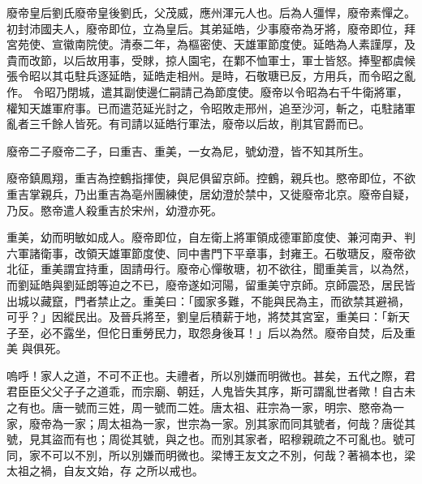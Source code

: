 
\begin{pinyinscope}

 廢帝皇后劉氏廢帝皇後劉氏，父茂威，應州渾元人也。后為人彊悍，廢帝素憚之。初封沛國夫人，廢帝即位，立為皇后。其弟延皓，少事廢帝為牙將，廢帝即位，拜宮苑使、宣徽南院使。清泰二年，為樞密使、天雄軍節度使。延皓為人素謹厚，及貴而改節，以后故用事，受賕，掠人園宅，在鄴不恤軍士，軍士皆怒。捧聖都虞候張令昭以其屯駐兵逐延皓，延皓走相州。是時，石敬瑭已反，方用兵，而令昭之亂作。
 令昭乃閉城，遣其副使邊仁嗣請己為節度使。廢帝以令昭為右千牛衛將軍，權知天雄軍府事。已而遣范延光討之，令昭敗走邢州，追至沙河，斬之，屯駐諸軍亂者三千餘人皆死。有司請以延皓行軍法，廢帝以后故，削其官爵而已。



 廢帝二子廢帝二子，曰重吉、重美，一女為尼，號幼澄，皆不知其所生。



 廢帝鎮鳳翔，重吉為控鶴指揮使，與尼俱留京師。控鶴，親兵也。愍帝即位，不欲重吉掌親兵，乃出重吉為亳州團練使，居幼澄於禁中，又徙廢帝北京。廢帝自疑，乃反。愍帝遣人殺重吉於宋州，幼澄亦死。



 重美，幼而明敏如成人。廢帝即位，自左衛上將軍領成德軍節度使、兼河南尹、判六軍諸衛事，改領天雄軍節度使、同中書門下平章事，封雍王。石敬瑭反，廢帝欲北征，重美謂宜持重，固請毋行。廢帝心憚敬瑭，初不欲往，聞重美言，以為然，而劉延皓與劉延朗等迫之不已，廢帝遂如河陽，留重美守京師。京師震恐，居民皆出城以藏竄，門者禁止之。重美曰：「國家多難，不能與民為主，而欲禁其避禍，可乎？」因縱民出。及晉兵將至，劉皇后積薪于地，將焚其宮室，重美曰：「新天子至，必不露坐，但佗日重勞民力，取怨身後耳！」后以為然。廢帝自焚，后及重美
 與俱死。



 嗚呼！家人之道，不可不正也。夫禮者，所以別嫌而明微也。甚矣，五代之際，君君臣臣父父子子之道乖，而宗廟、朝廷，人鬼皆失其序，斯可謂亂世者歟！自古未之有也。唐一號而三姓，周一號而二姓。唐太祖、莊宗為一家，明宗、愍帝為一家，廢帝為一家；周太祖為一家，世宗為一家。別其家而同其號者，何哉？唐從其號，見其盜而有也；周從其號，與之也。而別其家者，昭穆親疏之不可亂也。號可同，家不可以不別，所以別嫌而明微也。梁博王友文之不別，何哉？著禍本也，梁太祖之禍，自友文始，存
 之所以戒也。



\end{pinyinscope}